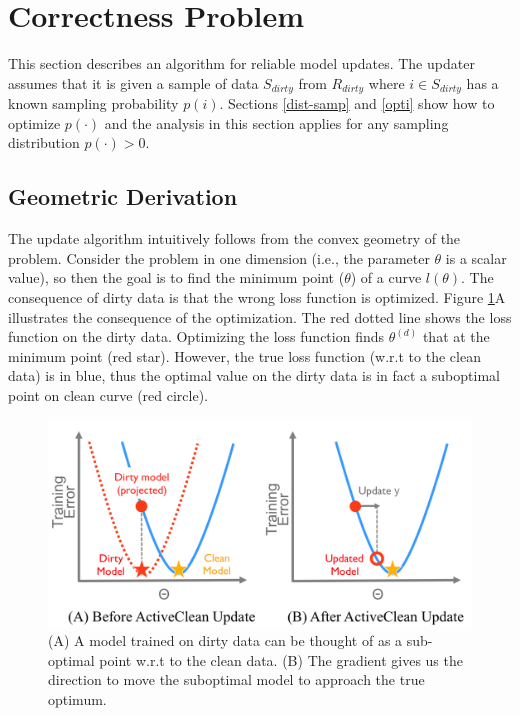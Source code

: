 \section{Correctness Problem}\label{model-update}
This section describes an algorithm for reliable model updates.
The updater assumes that it is given a sample of data $S_{dirty}$ from $R_{dirty}$ where $i \in S_{dirty}$ has a known sampling probability $p(i)$.
Sections \ref{dist-samp} and \ref{opti} show how to optimize $p(\cdot)$ and the analysis in this section applies for any sampling distribution $p(\cdot) > 0$.

\subsection{Geometric Derivation}\label{geod}
The update algorithm intuitively follows from the convex geometry of the problem.
Consider the problem in one dimension (i.e., the parameter $\theta$ is a scalar value), so then the goal is to find the minimum point ($\theta$) of a curve $l(\theta)$.
The consequence of dirty data is that the wrong loss function is optimized.
Figure \ref{update-arch2}A illustrates the consequence of the optimization.
The red dotted line shows the loss function on the dirty data.
Optimizing the loss function finds $\theta^{(d)}$ that at the minimum point (red star).
However, the true loss function (w.r.t to the clean data) is in blue, thus
the optimal value on the dirty data is in fact a suboptimal point on clean curve (red circle).

\begin{figure}[ht!]
\centering
 \includegraphics[width=\columnwidth]{figs/update-arch2.png}\vspace{-1em}
 \caption{(A) A model trained on dirty data can be thought of as a sub-optimal point w.r.t to the clean data. (B) The gradient gives us the direction to move the suboptimal model to approach the true optimum. \label{update-arch2}}\vspace{-1em}
\end{figure}

